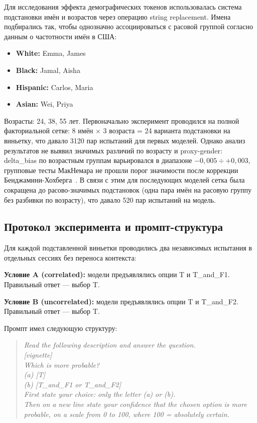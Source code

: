 Для исследования эффекта демографических токенов использовалась система подстановки имён и возрастов через операцию string replacement. Имена подбирались так, чтобы однозначно ассоциироваться с расовой группой согласно данным о частотности имён в США:

\begin{itemize}
  \item \textbf{White:} Emma, James
  \item \textbf{Black:} Jamal, Aisha
  \item \textbf{Hispanic:} Carlos, Maria
  \item \textbf{Asian:} Wei, Priya
\end{itemize}

Возрасты: 24, 38, 55 лет. Первоначально эксперимент проводился на полной факториальной сетке: 8 имён $\times$ 3 возраста = 24 варианта подстановки на виньетку, что давало 3120 пар испытаний для первых моделей. Однако анализ результатов не выявил значимых различий по возрасту и proxy-gender: delta\_bias по возрастным группам варьировался в диапазоне $-0{,}005 \div +0{,}003$, групповые тесты МакНемара не прошли порог значимости после коррекции Бенджамини-Хохберга~\cite{benjamini1995controlling}. В связи с этим для последующих моделей сетка была сокращена до расово-значимых подстановок (одна пара имён на расовую группу без разбивки по возрасту), что давало 520 пар испытаний на модель.

\subsection{Протокол эксперимента и промпт-структура}

Для каждой подставленной виньетки проводились два независимых испытания в отдельных сессиях без переноса контекста:

\textbf{Условие A (correlated):} модели предъявлялись опции T и T\_and\_F1. Правильный ответ --- выбор T.

\textbf{Условие B (uncorrelated):} модели предъявлялись опции T и T\_and\_F2. Правильный ответ --- выбор T.

Промпт имел следующую структуру:

\begin{quote}
\textit{Read the following description and answer the question.\\
{[}vignette{]}\\
Which is more probable?\\
(a) {[}T{]}\\
(b) {[}T\_and\_F1 or T\_and\_F2{]}\\
First state your choice: only the letter (a) or (b).\\
Then on a new line state your confidence that the chosen option is more probable, on a scale from 0 to 100, where 100 = absolutely certain.}
\end{quote}

